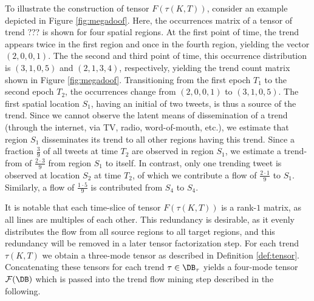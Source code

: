 \begin{example}  
To illustrate the construction of tensor $F(\tau(K,T))$, consider an example
depicted in Figure \ref{fig:megadoof}. Here, the occurrences matrix of a tensor
of trend ??? is shown for four spatial regions. At the first point of time, the
trend appears twice in the first region and once in the fourth region, yielding the vector $(2,0,0,1)$. The the second and third point of time, this occurrence distribution is $(3,1,0,5)$ and $(2,1,3,4)$, respectively, yielding the trend count matrix shown in Figure \ref{fig:megadoof}. Transitioning from the first epoch $T_1$ to the second epoch $T_2$, the occurrences change from $(2,0,0,1)$ to $(3,1,0,5)$. The first spatial location $S_1$, having an initial of two tweets, is thus a source of the trend. Since we cannot observe the latent means of dissemination of a trend (through the internet, via TV, radio, word-of-mouth, etc.), we estimate that region $S_1$ disseminates its trend to all other regions having this trend. Since a fraction $\frac{3}{9}$ of all tweets at time $T_2$ are observed in region $S_1$, we estimate a trend-from of $\frac{2\cdot 3}{9}$ from region $S_1$ to itself. In contrast, only one trending tweet is observed at location $S_2$ at time $T_2$, of which we contribute a flow of $\frac{2\cdot 1}{9}$ to $S_1$. Similarly, a flow of $\frac{1\cdot 5}{9}$ is contributed from $S_4$ to $S_4$.
\end{example}
It is notable that each time-slice of tensor $F(\tau(K,T))$ is a rank-$1$
matrix, as all lines are multiples of each other. This redundancy is desirable, as it evenly distributes the flow from all source regions to all target regions, and this redundancy will be removed in a later tensor factorization step.
For each trend $\tau(K,T)$ we obtain a three-mode tensor as described in Definition \ref{def:tensor}. Concatenating these tensors for each trend $\tau\in\DB_\tau$ yields a four-mode tensor $\mathcal{F}(\DB)$ which is passed into the trend flow mining step described in the following.

